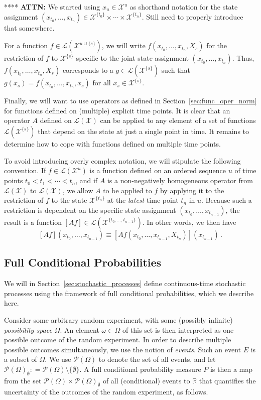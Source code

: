 \documentclass[10pt]{paper}
\theoremstyle{definition}
\newcommand{\reals}{\mathbb{R}}
\newcommand{\states}{\mathcal{X}}
\newcommand{\paths}{\Omega}
\newcommand{\power}{\mathcal{P}(\paths)}
\newcommand{\nonemptypower}{\power_{\emptyset}}
\newcommand{\gambles}{\mathcal{L}}
\newcommand{\gamblesX}{\gambles(\states)}
\newcommand{\coloneqq}{:\!=}
\begin{document}
**** {\bf ATTN:} We started using $x_u\in\states^u$ as shorthand notation for the state assignment $(x_{t_0},\ldots,x_{t_n})\in\states^{\{t_0\}}\times\cdots\times\states^{\{t_n\}}$. Still need to properly introduce that somewhere.

For a function $f\in\gambles(\states^{u\cup\{s\}})$, we will write $f(x_{t_0},\ldots,x_{t_n},X_s)$ for the restriction of $f$ to $\states^{\{s\}}$ specific to the joint state assignment $(x_{t_0},\ldots,x_{t_n})$. Thus, $f(x_{t_0},\ldots,x_{t_n},X_s)$ corresponds to a $g\in\gambles(\states^{\{s\}})$ such that $g(x_s) = f(x_{t_0},\ldots,x_{t_n},x_s)$ for all $x_s\in\states^{\{s\}}$.

Finally, we will want to use operators as defined in Section~\ref{sec:func_oper_norm} for functions defined on (multiple) explicit time points. It is clear that an operator $A$ defined on $\gamblesX$ can be applied to any element of a set of functions $\gambles(\states^{\{s\}})$ that depend on the state at just a single point in time. It remains to determine how to cope with functions defined on multiple time points. 

To avoid introducing overly complex notation, we will stipulate the following convention. If $f\in\gambles(\states^u)$ is a function defined on an ordered sequence $u$ of time points $t_0<t_1<\cdots<t_n$, and if $A$ is a non-negatively homogeneous operator from $\gamblesX$ to $\gamblesX$, we allow $A$ to be applied to $f$ by applying it to the restriction of $f$ to the state $\states^{\{t_n\}}$ at the \emph{latest} time point $t_n$ in $u$. Because such a restriction is dependent on the specific state assignment $(x_{t_0},\ldots,x_{t_{n-1}})$, the result is a function $[Af]\in\gambles(\states^{\{t_0,\ldots,t_{n-1}\}})$. In other words, we then have
\begin{equation*}
\left[Af\right](x_{t_0},\ldots,x_{t_{n-1}}) \equiv \left[A f(x_{t_0},\ldots,x_{t_{n-1}},X_{t_n})\right](x_{t_{n-1}})\,.
\end{equation*}

\subsection{Full Conditional Probabilities}\label{sec:cond_prob}

We will in Section~\ref{sec:stochastic_processes} define continuous-time stochastic processes using the framework of full conditional probabilities, which we describe here. 

Consider some arbitrary random experiment, with some (possibly infinite) \emph{possibility space} $\Omega$. An element $\omega\in\Omega$ of this set is then interpreted as one possible outcome of the random experiment. In order to describe multiple possible outcomes simultaneously, we use the notion of \emph{events}. Such an event $E$ is a subset of $\Omega$. We use $\power$ to denote the set of all events, and let $\nonemptypower\coloneqq\power\setminus\{\emptyset\}$. A full conditional probability measure $P$ is then a map from the set $\power\times\nonemptypower$ of all (conditional) events to $\reals$ that quantifies the uncertainty of the outcomes of the random experiment, as follows.
\end{document}
